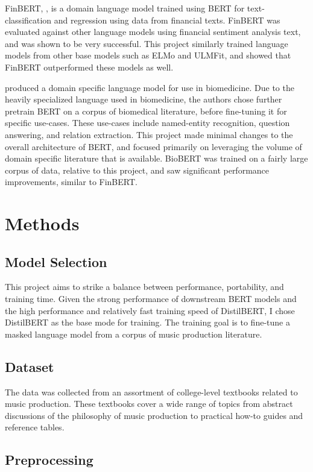 \documentclass[11pt,a4paper]{article}
\begin{document}
FinBERT, \cite{yang2020finbert}, is a domain language model trained using BERT for text-classification and regression using data from financial texts. FinBERT was evaluated against other language models using financial sentiment analysis text, and was shown to be very successful. This project similarly trained language models from other base models such as ELMo and ULMFit, and showed that FinBERT outperformed these models as well.

\citet{lee2019biobert} produced a domain specific language model for use in biomedicine. Due to the heavily specialized language used in biomedicine, the authors chose further pretrain BERT on a corpus of biomedical literature, before fine-tuning it for specific use-cases. These use-cases include named-entity recognition, question answering, and relation extraction. This project made minimal changes to the overall architecture of BERT, and focused primarily on leveraging the volume of domain specific literature that is available. BioBERT was trained on a fairly large corpus of data, relative to this project, and saw significant performance improvements, similar to FinBERT.

\section{Methods}

\subsection{Model Selection}

This project aims to strike a balance between performance, portability, and training time.
Given the strong performance of downstream BERT models and the high performance and relatively fast training speed of DistilBERT, I chose DistilBERT as the base mode for training. The training goal is to fine-tune a masked language model from a corpus of music production literature.

\subsection{Dataset}

The data was collected from an assortment of college-level textbooks related to music production. These textbooks cover a wide range of topics from abstract discussions of the philosophy of music production to practical how-to guides and reference tables. 

\subsection{Preprocessing}
\end{document}
